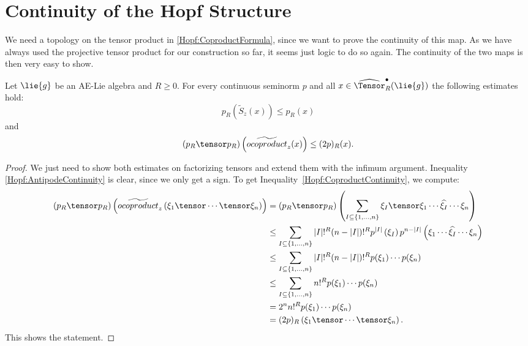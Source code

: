 \section{Continuity of the Hopf Structure}
We need a topology on the tensor product in \eqref{Hopf:CoproductFormula},
since we want to prove the continuity of this map. As we have always used the 
projective tensor product for our construction so far, it seems just logic to do 
so again. The continuity of the two maps is then very easy to show.
\begin{proposition}
    \label{Prop:Hopf:CoproductContinuity}%
    Let $\lie{g}$ be an AE-Lie algebra and $R \geq 0$. For every continuous 
    seminorm $p$ and all $x \in \widehat{\Tensor}_R^\bullet(\lie{g})$
    the following estimates hold:
    \begin{equation}
        \label{Hopf:AntipodeContinuity}
        p_R \left( \widetilde{S}_z(x) \right)
        \leq
        p_R (x)
    \end{equation}
    and
    \begin{equation}
        \label{Hopf:CoproductContinuity}
        (p_R \tensor p_R)
        \left( \widetilde{ocoproduct}_z(x) \right)
        \leq
        (2 p)_R (x).
    \end{equation}
\end{proposition}
\begin{proof}
	We just need to show both estimates on factorizing tensors and extend them 
	with the infimum argument. Inequality \eqref{Hopf:AntipodeContinuity} is 
	clear, since we only get a sign.
	To get Inequality~\eqref{Hopf:CoproductContinuity}, 
	we compute:
	\begin{align*}
		(p_R \tensor p_R)
        \left( \widetilde{ocoproduct}_z
        	\left(
        		\xi_1 \tensor \cdots \tensor \xi_n
        	\right)
        \right)
        & =
		(p_R \tensor p_R)
        \left( 
			\sum\limits_{
        		I \subseteq
        		\{1, \ldots, n\}
        	}
        	\xi_I
        	\tensor
        	\xi_1 \cdots
        	\widehat{\xi_I}
        	\cdots \xi_n
        \right)
        \\
        & \leq
        \sum\limits_{
        	I \subseteq
        	\{1, \ldots, n\}
        }
        |I|!^R (n - |I|)!^R
        p^{|I|} \left( \xi_I \right)
        p^{n - |I|}
        \left( 
        	\xi_1 \cdots \widehat{\xi_I} \cdots \xi_n 
        \right)
        \\
        & \leq
        \sum\limits_{
        	I \subseteq
        	\{1, \ldots, n\}
        }
        |I|!^R (n - |I|)!^R
        p(\xi_1) \cdots p(\xi_n)
        \\
        & \leq
        \sum\limits_{
        	I \subseteq
        	\{1, \ldots, n\}
        }
        n!^R
        p(\xi_1) \cdots p(\xi_n)
        \\
        & =
        2^n n!^R
        p(\xi_1) \cdots p(\xi_n)
        \\
        & =
        (2p)_R \left(
        	\xi_1 \tensor \cdots \tensor \xi_n
        \right).
	\end{align*}
	This shows the statement.
\end{proof}
